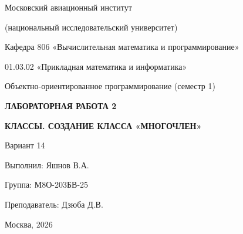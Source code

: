 \begin{titlepage}
\thispagestyle{empty}
\centering

{\Large Московский авиационный институт\par}
{\large (национальный исследовательский университет)\par}

\vspace{0.6cm}

{\large Кафедра 806 «Вычислительная математика и программирование»\par}
\vspace{0.3cm}
{\large 01.03.02 «Прикладная математика и информатика»\par}

\vspace{0.4cm}

{\large Объектно-ориентированное программирование (семестр 1)\par}

\vfill

{\LARGE\bfseries ЛАБОРАТОРНАЯ РАБОТА 2\par}
\vspace{0.4cm}
{\Large\bfseries КЛАССЫ. СОЗДАНИЕ КЛАССА «МНОГОЧЛЕН»\par}

\vspace{1.4cm}

{\large Вариант 14\par}

\vfill

\begin{flushright}
\begin{minipage}{0.55\textwidth}
Выполнил: Яшнов В.А.

\vspace{0.5cm}

Группа: М8О-203БВ-25

\vspace{0.5cm}

Преподаватель: Дзюба Д.В.
\end{minipage}
\end{flushright}

\vspace{0.8cm}

{\large Москва, 2026\par}

\end{titlepage}

\tableofcontents
\clearpage
{}
\setcounter{page}{2}
